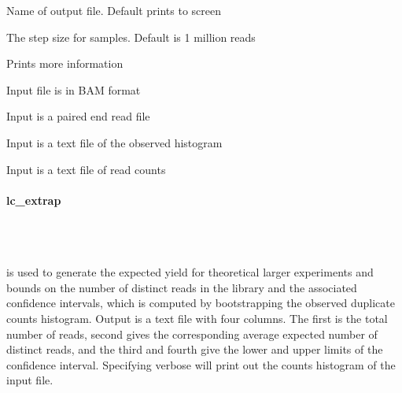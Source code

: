 \documentclass[11pt, titlepage]{article}
\begin{document}
\begin{description}[style=multiline,leftmargin=6cm,font=\ttfamily]
\item[\begingroup \fontsize{9pt}{12pt}\selectfont-o, -output\endgroup] Name of output file. Default prints to screen
\item[\begingroup \fontsize{9pt}{12pt}\selectfont-s, -step\endgroup] The step size for samples. Default is 1 million reads
\item[\begingroup \fontsize{9pt}{12pt}\selectfont-v -verbose\endgroup] Prints more information
\item[\begingroup \fontsize{9pt}{12pt}\selectfont-B, -bam\endgroup] Input file is in BAM format
\item[\begingroup \fontsize{9pt}{12pt}\selectfont-P, -pe\endgroup] Input is a paired end read file
\item[\begingroup \fontsize{9pt}{12pt}\selectfont-H, -hist\endgroup] Input is a text file of the observed histogram
\item[\begingroup \fontsize{9pt}{12pt}\selectfont-V, -vals\endgroup] Input is a text file of read counts
\end{description}

\paragraph{lc\_extrap}~\\~\\[-.2cm]
\label{sec:librarycomplexity}

 is used to generate
the expected yield for theoretical larger
experiments and bounds on the number of distinct 
reads in the library and the associated confidence
intervals, which is computed by bootstrapping the observed duplicate counts histogram.
Output is a text file with four columns.  The
first is the total number of reads, second
gives the corresponding average
expected number of distinct reads, and the 
third and fourth give the lower and
upper
limits of the confidence interval.
Specifying verbose will print out the counts histogram
of the input file.  
\end{document}
